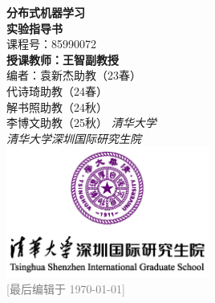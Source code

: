 \thispagestyle{empty}
\begin{titlepage}
    \begin{center}
        \vspace*{0pt}
        \makeatletter    
        \Large{\textbf{分布式机器学习}\\}
        \vspace{1ex}
        \Huge{\textbf{实验指导书}\\}
        \vspace{1ex}
        \small{课程号：85990072\\}
        \large
        \vspace{5ex}
        \textbf{授课教师：王智副教授}\\
        \vspace{.5ex}
        编者：袁新杰助教（23春）\\
        \hspace{3em}代诗琦助教（24春）\\
        \hspace{3em}解书照助教（24秋）\\
        \hspace{3em}李博文助教（25秋）
        \vfill
        \large\textit{清华大学}\\
        \large\textit{清华大学深圳国际研究生院}\\
        \vspace{3ex}
        \includegraphics[width=0.5\textwidth]{figures/tsinghua-icon.png}\\
        \vspace{2ex}
        \large
        \vspace{.5ex}
        \footnotesize \textcolor{gray}{[最后编辑于 \today]}
        \makeatother
    \end{center}
\end{titlepage}